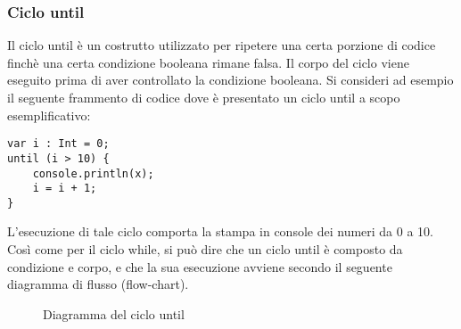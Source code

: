 \subsubsection{Ciclo until}
Il ciclo until è un costrutto utilizzato per ripetere una certa porzione di codice finchè una certa condizione booleana rimane falsa. Il corpo del 
ciclo viene eseguito prima di aver controllato la condizione booleana. Si consideri ad esempio il seguente frammento di codice dove è presentato un ciclo 
until a scopo esemplificativo:

\vspace{0.5cm}

\begin{lstlisting}[frame=single]
var i : Int = 0;
until (i > 10) {
    console.println(x);
    i = i + 1;
}
\end{lstlisting}

\vspace{0.5cm}

L’esecuzione di tale ciclo comporta la stampa in console dei numeri da 0 a 10. Così come per il ciclo while, si può dire che un ciclo until è 
composto da condizione e corpo, e che la sua esecuzione avviene secondo il seguente diagramma di flusso (flow-chart).

\vspace{0.5cm}

\begin{figure}[h]
    \centering
    \caption{Diagramma del ciclo until}
    \label{fig:flowchart2}
\end{figure}